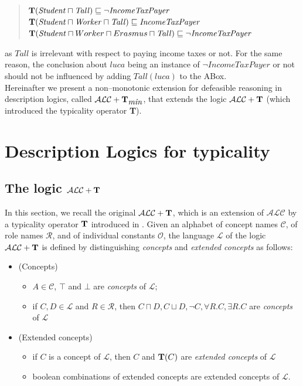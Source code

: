 \documentclass[a4paper, 11pt, oneside]{duthesis}
\newcommand{\tip}{{\bf T}}
\newcommand{\alc}{\mathcal{ALC}}
\newcommand{\alct}{\mathcal{ALC}+\tip}
\newcommand{\alctmin}{\mathcal{ALC}+\tip_{\mbox{\em min}}}
\newcommand{\vero} {\top}
\newcommand{\sqset}{\sqsubseteq}
\newcommand{\mint}{\sqcap}
\newcommand{\elle} {\mathcal{L}}
\begin{document}
\begin{quote}
$\tip (\mathit{Student} \mint \mathit{Tall}) \sqset \mathit{\neg IncomeTaxPayer}$\\
$\tip (\mathit{Student} \mint \mathit{Worker} \mint \mathit{Tall})  \sqset \mathit{IncomeTaxPayer}$ \\
$\tip (\mathit{Student} \mint Worker \mint Erasmus \mint \mathit{Tall})  \sqset \mathit{\neg IncomeTaxPayer}$
\end{quote}

\noindent as  $\mathit{Tall}$ is irrelevant with respect to paying income taxes or not. For the same reason, the conclusion about $\mathit{luca}$ being an instance of $\neg IncomeTaxPayer$ or not should not be influenced by adding $\mathit{Tall}(\mathit{luca})$ to the ABox.\\

Hereinafter we present a non--monotonic extension for defeasible reasoning in description logics, called $\alctmin$, that extends the logic $\alct$ (which introduced the typicality operator \tip).

\newpage


\chapter{Description Logics for typicality}\label{dlt}

\section{The logic $\alct$}\label{alct}


In this section, we recall the original $\alct$, which is an extension of $\alc$ by a typicality operator $\tip$ introduced in \cite{FI09}. Given an alphabet of concept names $\mathcal{C}$, of role names $\mathcal{R}$, and of individual constants $\mathcal{O}$, the language $\elle$ of the logic $\alct$ is defined by distinguishing \emph{concepts} and \emph{extended concepts} as follows:

\begin{itemize}
\item (Concepts)
  \begin{itemize}
     \item $A \in \mathcal{C}$, $\vero$ and $\bot$ are \emph{concepts} of
$\elle$;
    \item if $C, D \in \elle$ and $R \in \mathcal{R}$, then $C
\sqcap D, C \sqcup D, \neg C, \forall R.C, \exists R.C$ are
\emph{concepts} of $\elle$
  \end{itemize}
\item (Extended concepts)
    \begin{itemize}
       \item if $C$ is a
concept of $\elle$, then $C$ and $\tip(C)$ are \emph{extended concepts} of $\elle$
     \item boolean combinations of extended concepts are extended
concepts of $\elle$.
    \end{itemize}
\end{itemize}
\end{document}
